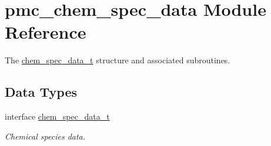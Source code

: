 \hypertarget{namespacepmc__chem__spec__data}{}\section{pmc\+\_\+chem\+\_\+spec\+\_\+data Module Reference}
\label{namespacepmc__chem__spec__data}


The \mbox{\hyperlink{structpmc__chem__spec__data_1_1chem__spec__data__t}{chem\+\_\+spec\+\_\+data\+\_\+t}} structure and associated subroutines.  


\subsection*{Data Types}
\begin{DoxyCompactItemize}
\item 
interface \mbox{\hyperlink{structpmc__chem__spec__data_1_1chem__spec__data__t}{chem\+\_\+spec\+\_\+data\+\_\+t}}
\begin{DoxyCompactList}\small\item\em Chemical species data. \end{DoxyCompactList}\end{DoxyCompactItemize}
